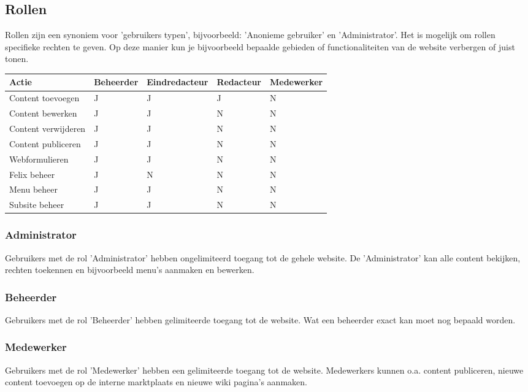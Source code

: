 \subsection{Rollen}\label{rollen}

Rollen zijn een synoniem voor 'gebruikers typen', bijvoorbeeld: 'Anonieme gebruiker' en 'Administrator'.  Het is mogelijk om rollen specifieke rechten te geven. Op deze manier kun je bijvoorbeeld bepaalde gebieden of functionaliteiten van de website verbergen of juist tonen. 

\begin{tabularx}{\textwidth}{ | p{5cm} |X|X|X|X| }
  \hline
  Actie & Beheerder & Eindredacteur & Redacteur & Medewerker \\ \hline
  Content toevoegen  & J  & J  & J & N  \\ \hline
  Content bewerken  & J  & J  & N & N  \\ \hline
  Content verwijderen  & J  & J  & N & N  \\ \hline
  Content publiceren  & J  & J  & N & N  \\ \hline
  Webformulieren  & J  & J  & N & N  \\ \hline
  Felix beheer  & J  & N  & N & N  \\ \hline
  Menu beheer  & J  & J  & N & N  \\ \hline
  Subsite beheer  & J  & J  & N & N  \\ \hline
\end{tabularx}

\subsubsection{Administrator}\label{administrator}
Gebruikers met de rol 'Administrator' hebben ongelimiteerd toegang tot de gehele website. De 'Administrator' kan alle content bekijken, rechten toekennen en bijvoorbeeld menu's aanmaken en bewerken.

\subsubsection{Beheerder}\label{beheerder}
Gebruikers met de rol 'Beheerder' hebben gelimiteerde toegang tot de website. Wat een beheerder exact kan moet nog bepaald worden.

\subsubsection{Medewerker}\label{medewerker}
Gebruikers met de rol 'Medewerker' hebben een gelimiteerde toegang tot de website. Medewerkers kunnen o.a. content publiceren, nieuwe content toevoegen op de interne marktplaats en nieuwe wiki pagina's aanmaken.

